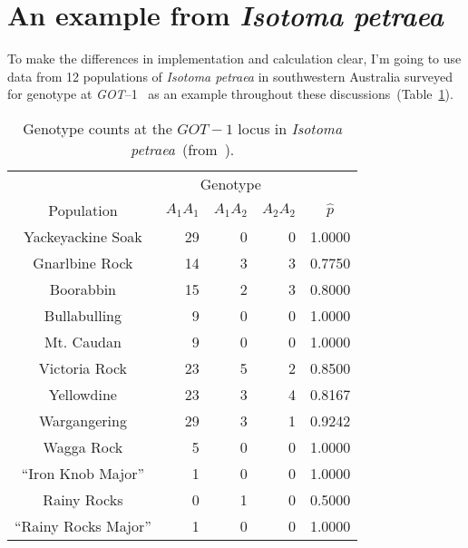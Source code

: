 \documentclass[12pt]{article}
\begin{document}
\section*{An example from {\it Isotoma petraea}}

To make the differences in implementation and calculation clear, I'm
going to use data from 12 populations of {\it Isotoma petraea\/} in
southwestern Australia surveyed for genotype at {\it
  GOT\/}--1~\cite{James-etal-1983} as an example throughout these
discussions~(Table~\ref{table:isotoma}).
\begin{table}
\begin{center}
\begin{tabular}{c|rrr|c}
\hline\hline
           & \multicolumn{3}{c|}{Genotype} & \\
Population & $A_{1}A_{1}$ & $A_{1}A_{2}$ & $A_{2}A_{2}$ & $\hat p$ \\
\hline
Yackeyackine Soak     & 29 & 0 & 0 & 1.0000 \\
Gnarlbine Rock        & 14 & 3 & 3 & 0.7750 \\
Boorabbin             & 15 & 2 & 3 & 0.8000 \\
Bullabulling          & 9  & 0 & 0 & 1.0000 \\
Mt. Caudan            & 9  & 0 & 0 & 1.0000 \\
Victoria Rock         & 23 & 5 & 2 & 0.8500 \\
Yellowdine            & 23 & 3 & 4 & 0.8167 \\
Wargangering          & 29 & 3 & 1 & 0.9242 \\
Wagga Rock            & 5  & 0 & 0 & 1.0000 \\
``Iron Knob Major''   & 1  & 0 & 0 & 1.0000 \\
Rainy Rocks           & 0  & 1 & 0 & 0.5000 \\
``Rainy Rocks Major'' & 1  & 0 & 0 & 1.0000 \\
\hline
\end{tabular}
\end{center}
\caption{Genotype counts at the $GOT-1$ locus in {\it Isotoma
    petraea}~(from~\cite{James-etal-1983}).}\label{table:isotoma}
\end{table}
\end{document}
